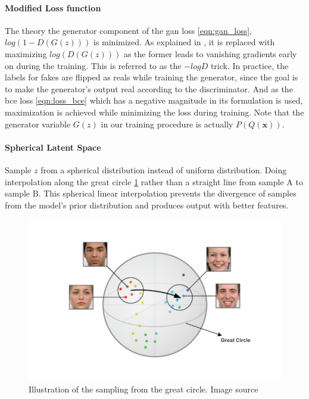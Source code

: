\paragraph{Modified Loss function}
The theory the generator component of the \ac{gan} loss \ref{eqn:gan_loss}, $log(1-D(G(z)))$ is minimized. As explained in , it is replaced with maximizing $log(D(G(z)))$ as the former leads to vanishing gradients early on during the training. This is referred to as the $-logD$ trick. In practice, the labels for fakes are flipped as reals while training the generator, since the goal is to make the generator's output real according to the discriminator. And as the \ac{bce} loss \ref{eqn:loss_bce} which has a negative magnitude in its formulation is used, maximization is achieved while minimizing the loss during training. Note that the generator variable $G(z)$ in our training procedure is actually $P(Q(\textbf{x}))$. 

\paragraph{Spherical Latent Space}
Sample $z$ from a spherical distribution instead of uniform distribution. Doing interpolation along the great circle \ref{fig:great_circle} rather than a straight line from sample A to sample B. This spherical linear interpolation prevents the divergence of samples from the model's prior distribution and produces output with better features.

\begin{figure}[h] 
    \centering
    \includegraphics[width=\textwidth]{figures/background/sphericalZ.png}
    \caption{Illustration of the sampling from the great circle. Image source \cite{spherical_sampling}}
    \label{fig:great_circle}
\end{figure}

